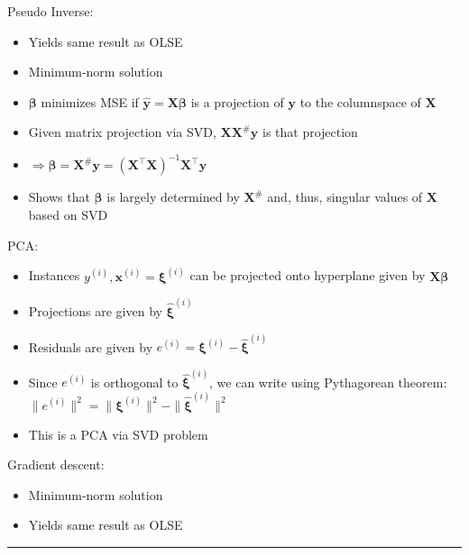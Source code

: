 Pseudo Inverse:
\begin{itemize}
    \item Yields same result as OLSE
    \item Minimum-norm solution
    \item $\boldsymbol{\beta}$ minimizes MSE if $\hat{\boldsymbol{y}} = \boldsymbol{X}\boldsymbol{\beta}$ is a projection of $\boldsymbol{y}$ to the columnspace of $\boldsymbol{X}$
    \item Given matrix projection via SVD, $\boldsymbol{X} \boldsymbol{X}^{\#} \boldsymbol{y}$ is that projection
    \item $\Rightarrow \boldsymbol{\beta} = \boldsymbol{X}^{\#} \boldsymbol{y} = (\boldsymbol{X}^\intercal \boldsymbol{X})^{-1}  \boldsymbol{X}^\intercal \boldsymbol{y}$
    \item Shows that $\boldsymbol{\beta}$ is largely determined by $\boldsymbol{X}^{\#}$ and, thus, singular values of $\boldsymbol{X}$ based on SVD
\end{itemize}
PCA:
\begin{itemize}
    \item Instances $y^{(i)}, \boldsymbol{x}^{(i)} = \boldsymbol{\xi}^{(i)}$ can be projected onto hyperplane given by $\boldsymbol{X}\boldsymbol{\beta}$
    \item Projections are given by $\hat{\boldsymbol{\xi}}^{(i)}$
    \item Residuals are given by $e^{(i)} = \boldsymbol{\xi}^{(i)} - \hat{\boldsymbol{\xi}}^{(i)}$
    \item Since $e^{(i)}$ is orthogonal to $\hat{\boldsymbol{\xi}}^{(i)}$, we can write using Pythagorean theorem: $\| e^{(i)} \|^2 = \| \boldsymbol{\xi}^{(i)} \|^2 - \| \hat{\boldsymbol{\xi}}^{(i)} \|^2$
    \item This is a PCA via SVD problem
\end{itemize}
Gradient descent:
\begin{itemize}
    \item Minimum-norm solution
    \item Yields same result as OLSE
\end{itemize}

{\color{lightgray}\hrule height 0.001mm}

